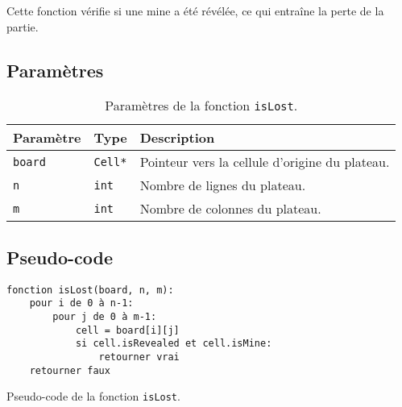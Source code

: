 Cette fonction vérifie si une mine a été révélée, ce qui entraîne la perte de la partie.

\subsection{Paramètres}

\begin{table}[!htpb]
    \label{tab:parameters-isLost}
    \begin{tabularx}{\textwidth}{lXX}
        \toprule
        \textbf{Paramètre} & \textbf{Type} & \textbf{Description} \\
        \midrule
        \texttt{board} & \texttt{Cell*} & Pointeur vers la cellule d'origine du plateau. \\
        \texttt{n} & \texttt{int} & Nombre de lignes du plateau. \\
        \texttt{m} & \texttt{int} & Nombre de colonnes du plateau. \\
        \bottomrule
    \end{tabularx}
    \caption{Paramètres de la fonction \texttt{isLost}.}
\end{table}

\subsection{Pseudo-code}

\begin{listing}[!htpb]
    \begin{verbatim}
fonction isLost(board, n, m):
    pour i de 0 à n-1:
        pour j de 0 à m-1:
            cell = board[i][j]
            si cell.isRevealed et cell.isMine:
                retourner vrai
    retourner faux
    \end{verbatim}
    \caption{Pseudo-code de la fonction \texttt{isLost}.}
\end{listing}